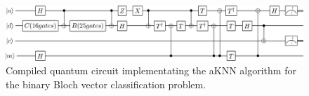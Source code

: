 \begin{figure}[!ht]
       \centering
       \includegraphics[width=\textwidth]{img/fullQKNN.png}
       \caption[]{\label{img:toffolidecomp} Compiled quantum circuit implementating the aKNN algorithm for the binary Bloch vector classification problem.}
\end{figure}


